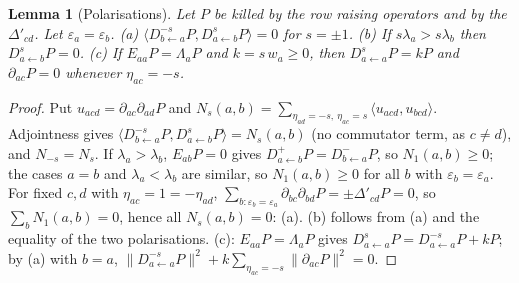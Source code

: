 \documentclass[10pt]{amsart}
\newtheorem{lemma}[theorem]{Lemma}
\theoremstyle{definition}
\theoremstyle{remark}
\begin{document}
\begin{lemma}[Polarisations]\label{par:polar}
Let $P$ be killed by the row raising operators and by the $\Delta'_{cd}$. Let $\varepsilon_a=\varepsilon_b$.
\textup{(a)} $\langle D^{-s}_{b\leftarrow a}P,D^{s}_{a\leftarrow b}P\rangle=0$ for $s=\pm1$.
\textup{(b)} If $s\lambda_a>s\lambda_b$ then $D^s_{a\leftarrow b}P=0$.
\textup{(c)} If $E_{aa}P=\Lambda_aP$ and $k=s\,w_a\ge0$, then $D^s_{a\leftarrow a}P=kP$ and
$\partial_{ac}P=0$ whenever $\eta_{ac}=-s$.
\end{lemma}
\begin{proof}
Put $u_{acd}=\partial_{ac}\partial_{ad}P$ and $N_s(a,b)=\sum_{\eta_{ad}=-s,\ \eta_{ac}=s}\langle u_{acd},u_{bcd}
\rangle$. Adjointness gives $\langle D^{-s}_{b\leftarrow a}P,D^s_{a\leftarrow b}P\rangle=N_s(a,b)$ (no
commutator term, as $c\ne d$), and $N_{-s}=N_s$. If $\lambda_a>\lambda_b$, $E_{ab}P=0$ gives
$D^+_{a\leftarrow b}P=D^-_{b\leftarrow a}P$, so $N_1(a,b)\ge0$; the cases $a=b$ and $\lambda_a<\lambda_b$
are similar, so $N_1(a,b)\ge0$ for all $b$ with $\varepsilon_b=\varepsilon_a$. For fixed $c,d$ with
$\eta_{ac}=1=-\eta_{ad}$, $\sum_{b:\varepsilon_b=\varepsilon_a}\partial_{bc}\partial_{bd}P=\pm\Delta'_{cd}P=0$, so
$\sum_bN_1(a,b)=0$, hence all $N_s(a,b)=0$: (a). (b) follows from (a) and the equality of the two
polarisations. (c): $E_{aa}P=\Lambda_aP$ gives $D^s_{a\leftarrow a}P=D^{-s}_{a\leftarrow a}P+kP$; by (a)
with $b=a$, $\|D^{-s}_{a\leftarrow a}P\|^2+k\sum_{\eta_{ac}=-s}\|\partial_{ac}P\|^2=0$.
\end{proof}
\end{document}
